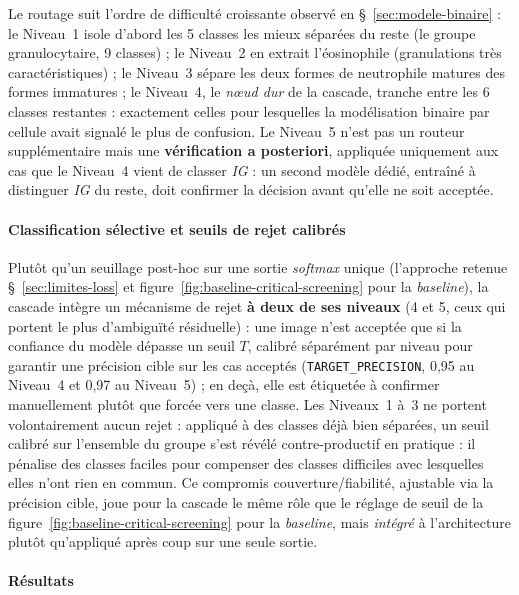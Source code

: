 Le routage suit l'ordre de difficulté croissante observé en \S~\ref{sec:modele-binaire} : le Niveau~1 isole d'abord les 5 classes les mieux séparées du reste (le groupe granulocytaire, 9 classes) ; le Niveau~2 en extrait l'éosinophile (granulations très caractéristiques) ; le Niveau~3 sépare les deux formes de neutrophile matures des formes immatures ; le Niveau~4, le \emph{n\oe{}ud dur} de la cascade, tranche entre les 6 classes restantes : exactement celles pour lesquelles la modélisation binaire par cellule avait signalé le plus de confusion.
Le Niveau~5 n'est pas un routeur supplémentaire mais une \textbf{vérification a posteriori}, appliquée uniquement aux cas que le Niveau~4 vient de classer \emph{IG} : un second modèle dédié, entraîné à distinguer \emph{IG} du reste, doit confirmer la décision avant qu'elle ne soit acceptée.

\paragraph{Classification sélective et seuils de rejet calibrés}

Plutôt qu'un seuillage post-hoc sur une sortie \emph{softmax} unique (l'approche retenue \S~\ref{sec:limites-loss} et figure~\ref{fig:baseline-critical-screening} pour la \emph{baseline}), la cascade intègre un mécanisme de rejet \textbf{à deux de ses niveaux} (4 et 5, ceux qui portent le plus d'ambiguïté résiduelle) : une image n'est acceptée que si la confiance du modèle dépasse un seuil $T$, calibré séparément par niveau pour garantir une précision cible sur les cas acceptés (\texttt{TARGET\_PRECISION}, 0,95 au Niveau~4 et 0,97 au Niveau~5) ; en deçà, elle est étiquetée \og à confirmer manuellement \fg{} plutôt que forcée vers une classe.
Les Niveaux~1 à~3 ne portent volontairement aucun rejet : appliqué à des classes déjà bien séparées, un seuil calibré sur l'ensemble du groupe s'est révélé contre-productif en pratique : il pénalise des classes faciles pour compenser des classes difficiles avec lesquelles elles n'ont rien en commun.
Ce compromis couverture/fiabilité, ajustable via la précision cible, joue pour la cascade le même rôle que le réglage de seuil de la figure~\ref{fig:baseline-critical-screening} pour la \emph{baseline}, mais \emph{intégré} à l'architecture plutôt qu'appliqué après coup sur une seule sortie.

\paragraph{Résultats}
\label{sec:resultats-hierarchique}

